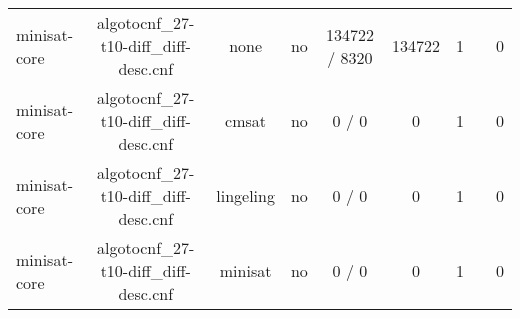 \begin{appendices}
\begin{table}[p]
\begin{center}
\begin{tabular}{l|cccccccc}
  minisat-core                   & algotocnf\_27-t10-diff\_diff-desc.cnf & none       & no    & 134722 / 8320 & 134722    & 1         &            & 0 \\ %
  minisat-core                   & algotocnf\_27-t10-diff\_diff-desc.cnf & cmsat      & no    & 0 / 0      & 0         & 1         &            & 0 \\ %
  minisat-core                   & algotocnf\_27-t10-diff\_diff-desc.cnf & lingeling  & no    & 0 / 0      & 0         & 1         &            & 0 \\ %
  minisat-core                   & algotocnf\_27-t10-diff\_diff-desc.cnf & minisat    & no    & 0 / 0      & 0         & 1         &            & 0 \\ %
    \end{tabular}
  \end{center}
\end{table}

\newpage


\end{appendices}
